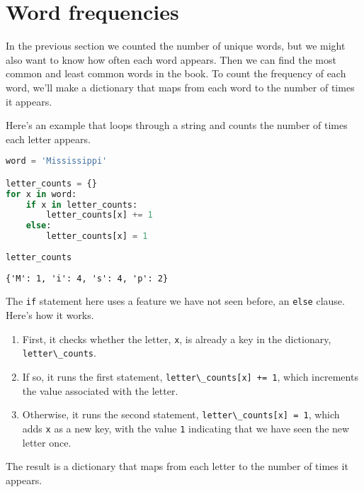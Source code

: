 \hypertarget{word-frequencies}{%
\section{Word frequencies}\label{word-frequencies}}

In the previous section we counted the number of unique words, but we
might also want to know how often each word appears. Then we can find
the most common and least common words in the book. To count the
frequency of each word, we'll make a dictionary that maps from each word
to the number of times it appears.

Here's an example that loops through a string and counts the number of
times each letter appears.

\begin{lstlisting}[language=Python,style=source]
word = 'Mississippi'

letter_counts = {}
for x in word:
    if x in letter_counts:
        letter_counts[x] += 1
    else:
        letter_counts[x] = 1
        
letter_counts
\end{lstlisting}

\begin{lstlisting}[style=output]
{'M': 1, 'i': 4, 's': 4, 'p': 2}
\end{lstlisting}

The \passthrough{\lstinline!if!} statement here uses a feature we have
not seen before, an \passthrough{\lstinline!else!} clause. Here's how it
works.

\begin{enumerate}
\def\labelenumi{\arabic{enumi}.}
\item
  First, it checks whether the letter, \passthrough{\lstinline!x!}, is
  already a key in the dictionary,
  \passthrough{\lstinline!letter\_counts!}.
\item
  If so, it runs the first statement,
  \passthrough{\lstinline!letter\_counts[x] += 1!}, which increments the
  value associated with the letter.
\item
  Otherwise, it runs the second statement,
  \passthrough{\lstinline!letter\_counts[x] = 1!}, which adds
  \passthrough{\lstinline!x!} as a new key, with the value
  \passthrough{\lstinline!1!} indicating that we have seen the new
  letter once.
\end{enumerate}

The result is a dictionary that maps from each letter to the number of
times it appears.

